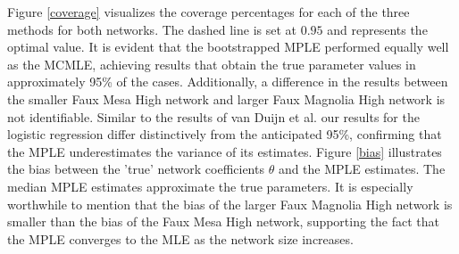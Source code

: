 \documentclass[10pt, conference, compsocconf]{IEEEtran}
\begin{document}
Figure \ref{coverage} visualizes the coverage percentages for each of the three methods for both networks. The dashed line is set at $0.95$ and represents the optimal value. It is evident that the bootstrapped MPLE performed equally well as the MCMLE, achieving results that obtain the true parameter values in approximately 95\% of the cases. Additionally, a difference in the results between the smaller Faux Mesa High network and larger Faux Magnolia High network is not identifiable. Similar to the results of van Duijn et al. \cite{vanDuijnetal2009} our results for the logistic regression differ distinctively from the anticipated 95\%, confirming that the MPLE underestimates the variance of its estimates.
Figure \ref{bias} illustrates the bias between the 'true' network coefficients $\theta$ and the MPLE estimates. The median MPLE estimates approximate the true parameters. It is especially worthwhile to mention that the bias of the larger Faux Magnolia High network is smaller than the bias of the Faux Mesa High network, supporting the fact that the MPLE converges to the MLE as the network size increases.
\end{document}
